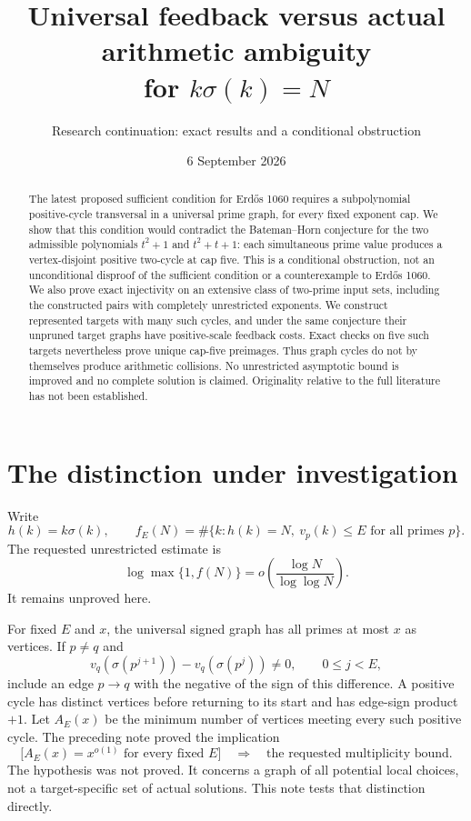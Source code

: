 \documentclass[11pt]{article}
\title{Universal feedback versus actual arithmetic ambiguity\\for \texorpdfstring{$k\sigma(k)=N$}{k sigma(k)=N}}
\author{Research continuation: exact results and a conditional obstruction}
\date{6 September 2026}
\begin{document}
\maketitle
\begin{abstract}
The latest proposed sufficient condition for Erd\H{o}s 1060 requires a subpolynomial positive-cycle transversal in a universal prime graph, for every fixed exponent cap. We show that this condition would contradict the Bateman--Horn conjecture for the two admissible polynomials $t^2+1$ and $t^2+t+1$: each simultaneous prime value produces a vertex-disjoint positive two-cycle at cap five. This is a conditional obstruction, not an unconditional disproof of the sufficient condition or a counterexample to Erd\H{o}s 1060. We also prove exact injectivity on an extensive class of two-prime input sets, including the constructed pairs with completely unrestricted exponents. We construct represented targets with many such cycles, and under the same conjecture their unpruned target graphs have positive-scale feedback costs. Exact checks on five such targets nevertheless prove unique cap-five preimages. Thus graph cycles do not by themselves produce arithmetic collisions. No unrestricted asymptotic bound is improved and no complete solution is claimed. Originality relative to the full literature has not been established.
\end{abstract}

\section{The distinction under investigation}
Write
\[
 h(k)=k\sigma(k),\qquad f_E(N)=\#\{k:h(k)=N,\ v_p(k)\le E\text{ for all primes }p\}.
\]
The requested unrestricted estimate is
\[
 \log\max\{1,f(N)\}=o\!\left(\frac{\log N}{\log\log N}\right).
\]
It remains unproved here.

For fixed $E$ and $x$, the universal signed graph has all primes at most $x$ as vertices. If $p\ne q$ and
\[
 v_q(\sigma(p^{j+1}))-v_q(\sigma(p^j))\ne0,
 \qquad 0\le j<E,
\]
include an edge $p\to q$ with the negative of the sign of this difference. A positive cycle has distinct vertices before returning to its start and has edge-sign product $+1$.
Let $A_E(x)$ be the minimum number of vertices meeting every such positive cycle. The preceding note proved the implication
\[
 \bigl[A_E(x)=x^{o(1)}\text{ for every fixed }E\bigr]
 \quad\Longrightarrow\quad\text{the requested multiplicity bound}.
\]
The hypothesis was not proved. It concerns a graph of all potential local choices, not a target-specific set of actual solutions. This note tests that distinction directly.
\end{document}
